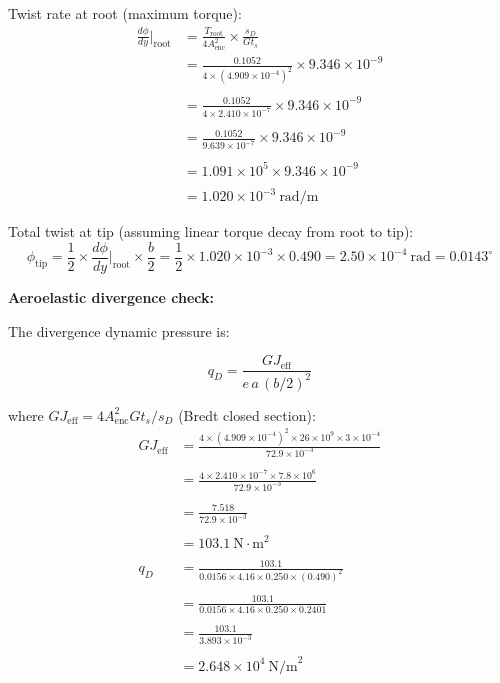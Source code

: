 \documentclass[10pt,a4paper]{article}
\begin{document}
Twist rate at root (maximum torque):
\begin{align*}
\frac{d\phi}{dy}\bigg|_{\text{root}} 
&= \frac{T_{\text{root}}}{4 A_{\text{enc}}^2} \times \frac{s_D}{G t_s} \\
&= \frac{0.1052}{4 \times (4.909 \times 10^{-4})^2} \times 9.346 \times 10^{-9} \\
\\
&= \frac{0.1052}{4 \times 2.410 \times 10^{-7}} \times 9.346 \times 10^{-9} \\
\\
&= \frac{0.1052}{9.639 \times 10^{-7}} \times 9.346 \times 10^{-9} \\
\\
&= 1.091 \times 10^{5} \times 9.346 \times 10^{-9} \\
\\
&= 1.020 \times 10^{-3}\ \text{rad/m}
\end{align*}

Total twist at tip (assuming linear torque decay from root to tip):
\[
\phi_{\text{tip}} = \frac{1}{2} \times \frac{d\phi}{dy}\bigg|_{\text{root}} \times \frac{b}{2} = \frac{1}{2} \times 1.020 \times 10^{-3} \times 0.490 = 2.50 \times 10^{-4}\ \text{rad} = 0.0143^{\circ}
\]

\textbf{Aeroelastic divergence check:}

The divergence dynamic pressure is:

\[
q_D = \frac{GJ_{\text{eff}}}{e\, a\, (b/2)^2}
\]

where $GJ_{\text{eff}} = 4 A_{\text{enc}}^2 G t_s / s_D$ (Bredt closed section):
\begin{align*}
GJ_{\text{eff}} 
&= \frac{4 \times (4.909 \times 10^{-4})^2 \times 26 \times 10^9 \times 3 \times 10^{-4}}{72.9 \times 10^{-3}} \\
\\
&= \frac{4 \times 2.410 \times 10^{-7} \times 7.8 \times 10^6}{72.9 \times 10^{-3}} \\
\\
&= \frac{7.518}{72.9 \times 10^{-3}} \\
\\
&= 103.1\ \text{N}\cdot\text{m}^2 \\
\\
q_D 
&= \frac{103.1}{0.0156 \times 4.16 \times 0.250 \times (0.490)^2} \\
\\
&= \frac{103.1}{0.0156 \times 4.16 \times 0.250 \times 0.2401} \\
\\
&= \frac{103.1}{3.893 \times 10^{-3}} \\
\\
&= 2.648 \times 10^{4}\ \text{N/m}^2
\end{align*}
\end{document}
